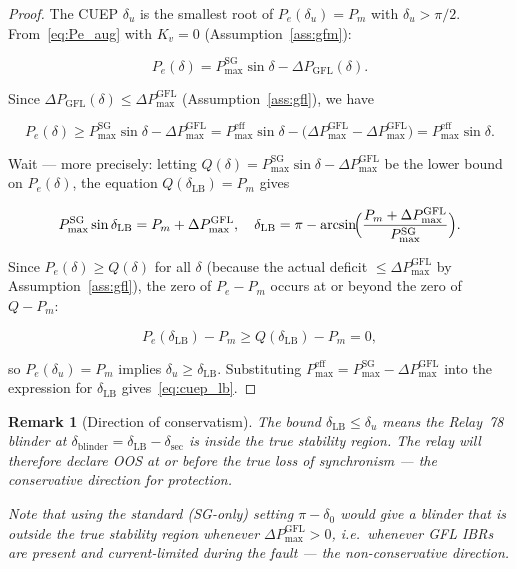 \documentclass[11pt,a4paper]{article}
\newtheorem{remark}{Remark}
\newcommand{\dz}{\delta_0}         %
\newcommand{\du}{\delta_u}         %
\newcommand{\dlb}{\delta_{\mathrm{LB}}}   %
\newcommand{\Pm}{P_m}
\newcommand{\PmaxSG}{P_{\max}^{\mathrm{SG}}}
\newcommand{\PmaxEff}{P_{\max}^{\mathrm{eff}}}
\newcommand{\Kv}{K_v}
\begin{document}
\begin{proof}
The CUEP $\du$ is the smallest root of $P_e(\du) = \Pm$ with
$\du > \pi/2$.  From~\eqref{eq:Pe_aug} with $\Kv = 0$
(Assumption~\ref{ass:gfm}):

\begin{equation}
  P_e(\delta) = \PmaxSG\sin\delta - \Delta P_{\mathrm{GFL}}(\delta).
  \label{eq:Pe_reduced}
\end{equation}

Since $\Delta P_{\mathrm{GFL}}(\delta) \leq \Delta P_{\max}^{\mathrm{GFL}}$
(Assumption~\ref{ass:gfl}), we have

\begin{equation}
  P_e(\delta) \geq \PmaxSG\sin\delta - \Delta P_{\max}^{\mathrm{GFL}}
             = \PmaxEff\sin\delta
             - \bigl(\Delta P_{\max}^{\mathrm{GFL}} - \Delta P_{\max}^{\mathrm{GFL}}\bigr)
             = \PmaxEff\sin\delta.
\end{equation}

Wait — more precisely: letting
$Q(\delta) = \PmaxSG\sin\delta - \Delta P_{\max}^{\mathrm{GFL}}$
be the lower bound on $P_e(\delta)$, the equation $Q(\dlb) = \Pm$ gives

\begin{equation}
  \PmaxSG\sin\dlb = \Pm + \Delta P_{\max}^{\mathrm{GFL}},
  \quad
  \dlb = \pi - \arcsin\!\Bigl(\frac{\Pm + \Delta P_{\max}^{\mathrm{GFL}}}{\PmaxSG}\Bigr).
\end{equation}

Since $P_e(\delta) \geq Q(\delta)$ for all $\delta$ (because the actual
deficit $\leq \Delta P_{\max}^{\mathrm{GFL}}$ by Assumption~\ref{ass:gfl}),
the zero of $P_e - \Pm$ occurs at or beyond the zero of $Q - \Pm$:

\begin{equation}
  P_e(\dlb) - \Pm \geq Q(\dlb) - \Pm = 0,
\end{equation}

so $P_e(\du) = \Pm$ implies $\du \geq \dlb$.
Substituting $\PmaxEff = \PmaxSG - \Delta P_{\max}^{\mathrm{GFL}}$ into the
expression for $\dlb$ gives~\eqref{eq:cuep_lb}.
\end{proof}

\begin{remark}[Direction of conservatism]
\label{rem:conservatism}
The bound $\dlb \leq \du$ means the Relay~78 blinder at $\delta_{\mathrm{blinder}}
= \dlb - \delta_{\mathrm{sec}}$ is \emph{inside} the true stability region.
The relay will therefore declare OOS at or before the true loss of
synchronism --- the conservative direction for protection.

Note that using the standard (SG-only) setting $\pi - \dz$ would give a
blinder that is \emph{outside} the true stability region whenever
$\Delta P_{\max}^{\mathrm{GFL}} > 0$, i.e.\ whenever GFL IBRs are present and
current-limited during the fault --- the non-conservative direction.
\end{remark}
\end{document}
